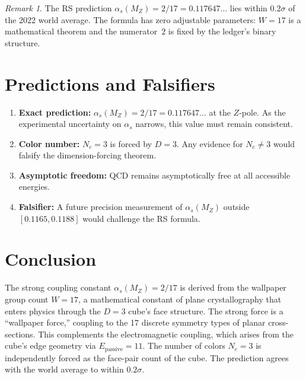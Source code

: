 \documentclass[12pt,a4paper]{article}
\theoremstyle{definition}
\theoremstyle{remark}
\newtheorem{remark}[theorem]{Remark}
\begin{document}
\begin{remark}
The RS prediction $\alpha_s(M_Z) = 2/17 = 0.117647\ldots$ lies
within $0.2\sigma$ of the 2022 world average.  The formula has
zero adjustable parameters: $W = 17$ is a mathematical theorem
and the numerator~$2$ is fixed by the ledger's binary structure.
\end{remark}

\section{Predictions and Falsifiers}
\label{sec:predictions}

\begin{enumerate}
  \item \textbf{Exact prediction:}
  $\alpha_s(M_Z) = 2/17 = 0.117647\ldots$ at the $Z$-pole.
  As the experimental uncertainty on $\alpha_s$ narrows, this
  value must remain consistent.

  \item \textbf{Color number:}
  $N_c = 3$ is forced by $D = 3$.  Any evidence for $N_c \neq 3$
  would falsify the dimension-forcing theorem.

  \item \textbf{Asymptotic freedom:}
  QCD remains asymptotically free at all accessible energies.

  \item \textbf{Falsifier:}
  A future precision measurement of $\alpha_s(M_Z)$ outside
  $[0.1165, 0.1188]$ would challenge the RS formula.
\end{enumerate}

\section{Conclusion}
\label{sec:conclusion}

The strong coupling constant $\alpha_s(M_Z) = 2/17$ is derived
from the wallpaper group count $W = 17$, a mathematical constant
of plane crystallography that enters physics through the
$D = 3$ cube's face structure.  The strong force is a
``wallpaper force,'' coupling to the 17 discrete symmetry types
of planar cross-sections.  This complements the electromagnetic
coupling, which arises from the cube's edge geometry via
$E_{\mathrm{passive}} = 11$.  The number of colors $N_c = 3$
is independently forced as the face-pair count of the cube.
The prediction agrees with the world average to within
$0.2\sigma$.
\end{document}

